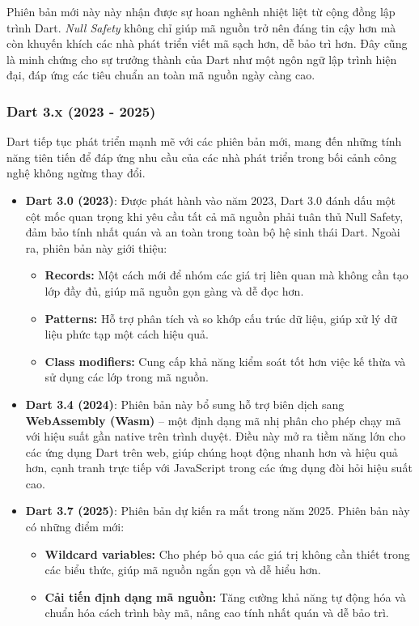 \documentclass[../DoAn.tex]{subfiles}
\numberwithin{figure}{chapter}
\begin{document}
Phiên bản mới này này nhận được sự hoan nghênh nhiệt liệt từ cộng đồng lập trình Dart. \textit{Null Safety} không chỉ giúp mã nguồn trở nên đáng tin cậy hơn mà còn khuyến khích các nhà phát triển viết mã sạch hơn, dễ bảo trì hơn. Đây cũng là minh chứng cho sự trưởng thành của Dart như một ngôn ngữ lập trình hiện đại, đáp ứng các tiêu chuẩn an toàn mã nguồn ngày càng cao.

\subsubsection{Dart 3.x (2023 - 2025)}
Dart tiếp tục phát triển mạnh mẽ với các phiên bản mới, mang đến những tính năng tiên tiến để đáp ứng nhu cầu của các nhà phát triển trong bối cảnh công nghệ không ngừng thay đổi.

\begin{itemize}
    \item \textbf{Dart 3.0 (2023)}: Được phát hành vào năm 2023, Dart 3.0 đánh dấu một cột mốc quan trọng khi yêu cầu tất cả mã nguồn phải tuân thủ Null Safety, đảm bảo tính nhất quán và an toàn trong toàn bộ hệ sinh thái Dart. Ngoài ra, phiên bản này giới thiệu:
    \begin{itemize}
        \item \textbf{Records: } Một cách mới để nhóm các giá trị liên quan mà không cần tạo lớp đầy đủ, giúp mã nguồn gọn gàng và dễ đọc hơn.
        \item \textbf{Patterns: } Hỗ trợ phân tích và so khớp cấu trúc dữ liệu, giúp xử lý dữ liệu phức tạp một cách hiệu quả.
        \item \textbf{Class modifiers: } Cung cấp khả năng kiểm soát tốt hơn việc kế thừa và sử dụng các lớp trong mã nguồn.
    \end{itemize}
    
    \item \textbf{Dart 3.4 (2024)}: Phiên bản này bổ sung hỗ trợ biên dịch sang \textbf{WebAssembly (Wasm)} – một định dạng mã nhị phân cho phép chạy mã với hiệu suất gần native trên trình duyệt. Điều này mở ra tiềm năng lớn cho các ứng dụng Dart trên web, giúp chúng hoạt động nhanh hơn và hiệu quả hơn, cạnh tranh trực tiếp với JavaScript trong các ứng dụng đòi hỏi hiệu suất cao.
    \item \textbf{Dart 3.7 (2025)}: Phiên bản dự kiến ra mắt trong năm 2025. Phiên bản này có những điểm mới:
    \begin{itemize}
        \item \textbf{Wildcard variables:} Cho phép bỏ qua các giá trị không cần thiết trong các biểu thức, giúp mã nguồn ngắn gọn và dễ hiểu hơn.
        \item \textbf{Cải tiến định dạng mã nguồn:} Tăng cường khả năng tự động hóa và chuẩn hóa cách trình bày mã, nâng cao tính nhất quán và dễ bảo trì.
    \end{itemize}
\end{itemize}
\end{document}
